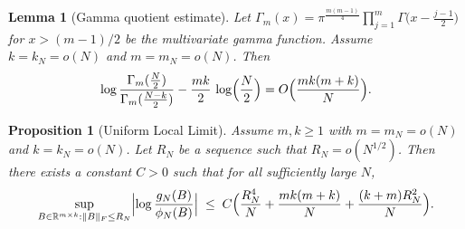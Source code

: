 \documentclass[10pt,a4paper]{amsart}
\newtheorem{proposition}{Proposition}
\newtheorem{lemma}{Lemma}
\begin{document}
	\begin{lemma}[Gamma quotient estimate]
		\label{lem:gamma_quotient}
		Let \(\Gamma_m(x) = \pi^{\frac{m(m-1)}4}\prod_{j=1}^m\Gamma\bigl(x-\frac{j-1}2\bigr)\) for $x > (m-1)/2$ be the multivariate gamma function. Assume \(k = k_N = o(N)\) and \(m = m_N = o(N)\). Then
		\[
		\log\frac{\Gamma_m(\frac N2)}{\Gamma_m(\frac{N-k}2)}
		  - \frac{mk}{2}\,\log\Bigl(\frac N2\Bigr)
		= O\Bigl(\frac{mk(m+k)}{N}\Bigr).
		\]
		\end{lemma}

		\begin{proposition}[Uniform Local Limit]
		\label{prop:uniform_local_limit}
		Assume \(m, k \ge 1\) with \(m = m_N = o(N)\) and \(k= k_N = o(N)\). Let \(R_N\) be a sequence such that \(R_N = o(N^{1/2})\). Then there exists a constant \(C>0\) such that for all sufficiently large \(N\),
		\[
		\sup_{B\in\mathbb R^{m\times k}: \|B\|_F \le R_N}
		\Bigl|
		\log \frac{g_N(B)}{\phi_N(B)}
		\Bigr|
		\;\le\;
		C\Bigl(\frac{R_N^4}{N} + \frac{mk(m+k)}{N} + \frac{(k+m)R_N^2}{N}\Bigr).
		\]
		\end{proposition}
\end{document}
